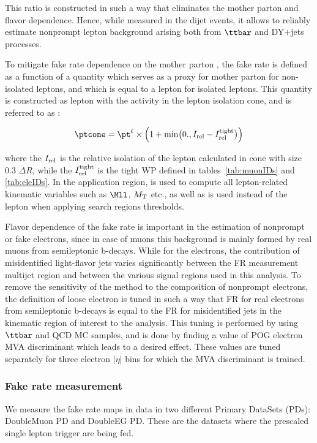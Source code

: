 This ratio is constructed in such a way that eliminates the mother parton \pt and flavor dependence.
Hence, while measured in the dijet events, it allows to reliably estimate nonprompt lepton background
arising both from $\ttbar$ and DY+jets processes. 

To mitigate fake rate dependence on the mother parton \pt, the fake rate is defined as a function
of a quantity which serves as a proxy for mother parton \pt for non-isolated leptons, and which
is equal to a lepton \pt for isolated leptons. This quantity is constructed as lepton \pt with 
the activity in the lepton isolation cone, and is referred to as \ptcone:

\begin{equation}
\ptcone = \pt^\ell\times\Bigl(1+ \min\bigl(0., \Irel - \Irel^\text{tight}\bigr) \Bigr)
\end{equation}

where the $I_{\mathrm{rel}}$ is the relative isolation of the lepton calculated in cone with size 0.3 $\Delta R$, while the $I_{\mathrm{rel}}^\text{tight}$ is the tight WP defined in tables~\ref{tab:muonIDs} and \ref{tab:eleIDs}.
In the application region, \ptcone is used to compute all lepton-related kinematic variables
such as $\Mll$, $M_{\mathrm{T}}$ etc., as well as is used instead of the lepton \pt when applying 
search regions \pt thresholds.

Flavor dependence of the fake rate is important in the estimation of nonprompt or fake electrons, 
since in case of muons this background is mainly formed by real muons from semileptonic b-decays.
While for the electrons, the contribution of misidentified light-flavor jets varies significantly between 
the FR measurement multijet region and between the various signal regions used in this analysis. 
To remove the sensitivity of the method to the composition of nonprompt electrons, the definition
of loose electron is tuned in such a way that FR for real electrons from semileptonic b-decays
is equal to the FR for misidentified jets in the kinematic region of interest to the analysis. 
This tuning is performed by using $\ttbar$ and QCD MC samples, and is done by finding a value of 
POG electron MVA discriminant which leads to a desired effect. These values are tuned separately 
for three electron $|\eta|$ bins for which the MVA discriminant is
trained. 

\subsubsection{Fake rate measurement} \label{sec:singleFR}
We measure the fake rate maps in data in two different Primary DataSets (PDs): DoubleMuon PD and DoubleEG PD.
These are the datasets where the prescaled single lepton trigger are being fed.

